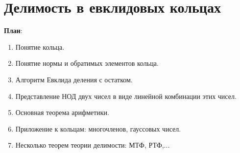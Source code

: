 \section{Делимость в евклидовых кольцах}


\textbf{План}:
\begin{enumerate}
\item Понятие кольца.
\item Понятие нормы и обратимых элементов кольца.
\item Алгоритм Евклида деления с остатком.
\item Представление НОД двух чисел в виде линейной комбинации этих чисел.
\item Основная теорема арифметики.
\item Приложение к кольцам: многочленов, гауссовых чисел.
\item Несколько теорем теории делимости: МТФ, РТФ,...
\end{enumerate}














